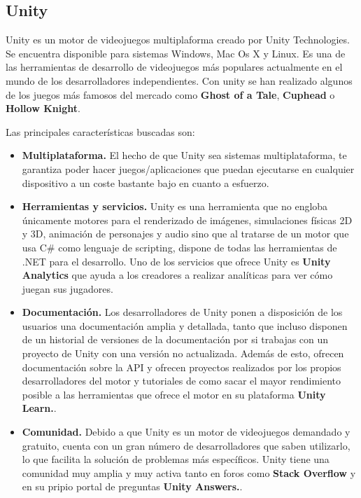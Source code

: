 \subsection{Unity}
\label{cap2:subsec:unity}

Unity es un motor de videojuegos multiplaforma creado por Unity Technologies. Se encuentra disponible para sistemas Windows, Mac Os X y Linux. Es una de las herramientas de desarrollo de videojuegos m\'as populares actualmente en el mundo de los desarrolladores independientes. Con unity se han realizado algunos de los juegos m\'as famosos del mercado como \textbf{Ghost of a Tale}, \textbf{Cuphead} o  \textbf{Hollow Knight}.

Las principales caracter\'isticas buscadas son:

\begin{itemize}
\item \textbf{Multiplataforma.} El hecho de que Unity sea sistemas multiplataforma, te garantiza poder hacer juegos/aplicaciones que puedan ejecutarse en cualquier dispositivo a un coste bastante bajo en cuanto a esfuerzo.

\item  \textbf{Herramientas y servicios.} Unity es una herramienta que no engloba \'unicamente motores para el renderizado de im\'agenes, simulaciones f\'isicas 2D y 3D, animaci\'on de personajes y audio sino que al tratarse de un motor que usa C\#  como lenguaje de scripting, dispone de todas las herramientas de .NET para el desarrollo. Uno de los servicios que ofrece Unity es \textbf{Unity Analytics} que ayuda a los creadores a realizar anal\'iticas para ver c\'omo juegan sus jugadores.

\item  \textbf{Documentaci\'on.} Los desarrolladores de Unity ponen a disposici\'on de los usuarios una documentaci\'on amplia y detallada, tanto que incluso disponen de un historial de versiones de la documentaci\'on por si trabajas con un proyecto de Unity con una versi\'on no actualizada. Adem\'as de esto, ofrecen documentaci\'on sobre la API y ofrecen proyectos realizados por los propios desarrolladores del motor y tutoriales de como sacar el mayor rendimiento posible a las herramientas que ofrece el motor en su plataforma \textbf{Unity Learn.}.

\item  \textbf{Comunidad.} Debido a que Unity es un motor de videojuegos demandado y gratuito, cuenta con un gran n\'umero de desarrolladores que saben utilizarlo, lo que facilita la soluci\'on de problemas m\'as espec\'ificos. Unity tiene una comunidad muy amplia y muy activa tanto en foros como \textbf{Stack Overflow} y en su pripio portal de preguntas \textbf{Unity Answers.}.
\end{itemize}

